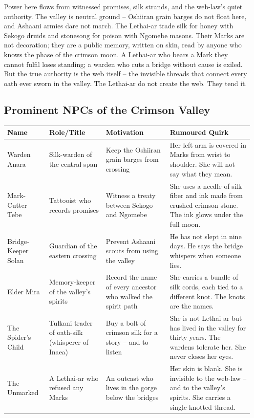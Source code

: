 Power here flows from witnessed promises, silk strands, and the web-law's quiet authority. The valley is neutral ground -- Oshiiran grain barges do not float here, and Ashaani armies dare not march. The Lethai-ar trade silk for honey with Sekogo druids and stonesong for poison with Ngomebe masons. Their Marks are not decoration; they are a public memory, written on skin, read by anyone who knows the phase of the crimson moon. A Lethai-ar who bears a Mark they cannot fulfil loses standing; a warden who cuts a bridge without cause is exiled. But the true authority is the web itself -- the invisible threads that connect every oath ever sworn in the valley. The Lethai-ar do not create the web. They tend it.

\subsection*{Prominent NPCs of the Crimson Valley}
\label{sec:lethaiar-npcs}

\begin{tabular}{|p{}|p{}|p{}|p{}|}
\hline
\textbf{Name} & \textbf{Role/Title} & \textbf{Motivation} & \textbf{Rumoured Quirk} \\
\hline
Warden Anara & Silk-warden of the central span & Keep the Oshiiran grain barges from crossing & Her left arm is covered in Marks from wrist to shoulder. She will not say what they mean. \\
\hline
Mark-Cutter Tebe & Tattooist who records promises & Witness a treaty between Sekogo and Ngomebe & She uses a needle of silk-fiber and ink made from crushed crimson stone. The ink glows under the full moon. \\
\hline
Bridge-Keeper Solan & Guardian of the eastern crossing & Prevent Ashaani scouts from using the valley & He has not slept in nine days. He says the bridge whispers when someone lies. \\
\hline
Elder Mira & Memory-keeper of the valley's spirits & Record the name of every ancestor who walked the spirit path & She carries a bundle of silk cords, each tied to a different knot. The knots are the names. \\
\hline
The Spider's Child & Tulkani trader of oath-silk (whisperer of Inaea) & Buy a bolt of crimson silk for a story -- and to listen & She is not Lethai-ar but has lived in the valley for thirty years. The wardens tolerate her. She never closes her eyes. \\
\hline
The Unmarked & A Lethai-ar who refused any Marks & An outcast who lives in the gorge below the bridges & Her skin is blank. She is invisible to the web-law -- and to the valley's spirits. She carries a single knotted thread. \\
\hline
\end{tabular}

